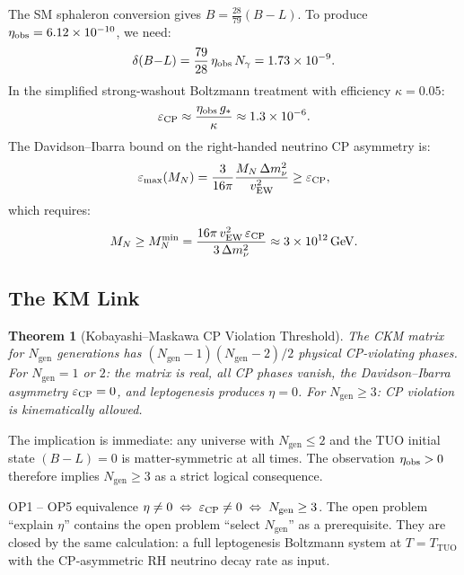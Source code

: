 \documentclass[12pt,a4paper]{article}
\newtheorem{theorem}{Theorem}[section]
\theoremstyle{definition}
\newcommand{\TTUO}{T_{\mathrm{TUO}}}
\newcommand{\gstar}{g_{*}}
\newcommand{\Ngen}{N_{\mathrm{gen}}}
\newcommand{\eps}{\varepsilon}
\newcommand{\dBmL}{\delta(B{-}L)}
\begin{document}
The SM sphaleron conversion gives $B = \tfrac{28}{79}(B-L)$.
To produce $\eta_{\rm obs} = 6.12\times10^{-10}$, we need:
\begin{equation}
  \dBmL = \frac{79}{28}\,\eta_{\rm obs}\,N_\gamma
  = 1.73\times10^{-9}.
\end{equation}
In the simplified strong-washout Boltzmann treatment with efficiency $\kappa = 0.05$:
\begin{equation}
  \eps_{\rm CP} \approx \frac{\eta_{\rm obs}\,\gstar}{\kappa}
  \approx 1.3\times10^{-6}.
\end{equation}
The Davidson--Ibarra bound on the right-handed neutrino CP asymmetry is:
\begin{equation}
  \eps_{\rm max}(M_N) = \frac{3}{16\pi}
  \frac{M_N\,\Delta m_\nu^2}{v_{\rm EW}^2}
  \geq \eps_{\rm CP},
\end{equation}
which requires:
\begin{equation}
  M_N \geq M_N^{\rm min}
  = \frac{16\pi\,v_{\rm EW}^2\,\eps_{\rm CP}}{3\,\Delta m_\nu^2}
  \approx 3\times10^{12}\,\mathrm{GeV}.
\end{equation}

\subsection{The KM Link}

\begin{theorem}[Kobayashi--Maskawa CP Violation Threshold]
\label{thm:km}
The CKM matrix for $\Ngen$ generations has
$(\Ngen-1)(\Ngen-2)/2$ physical CP-violating phases.
For $\Ngen = 1$ or $2$: the matrix is real, all CP phases vanish,
the Davidson--Ibarra asymmetry $\eps_{\rm CP} = 0$, and
leptogenesis produces $\eta = 0$.
For $\Ngen \geq 3$: CP violation is kinematically allowed.
\end{theorem}

The implication is immediate: any universe with $\Ngen \leq 2$ and the
TUO initial state $(B-L) = 0$ is matter-symmetric at all times.
The observation $\eta_{\rm obs} > 0$ therefore implies $\Ngen \geq 3$
as a strict logical consequence.

\begin{resultbox}{OP1 -- OP5 equivalence}
$\eta \neq 0 \;\Leftrightarrow\; \eps_{\rm CP} \neq 0 \;\Leftrightarrow\;
\Ngen \geq 3$.
The open problem ``explain $\eta$'' contains the open problem ``select $\Ngen$''
as a prerequisite. They are closed by the same calculation:
a full leptogenesis Boltzmann system at $T = \TTUO$ with the CP-asymmetric
RH neutrino decay rate as input.
\end{resultbox}
\end{document}
